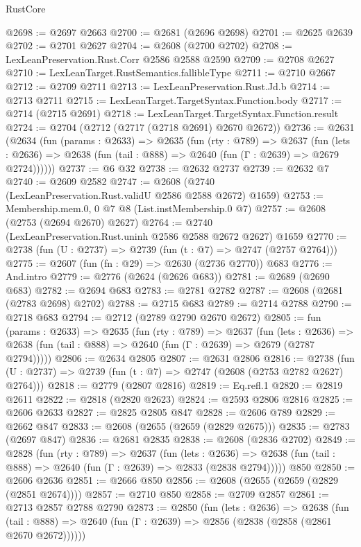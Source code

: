 \begin{lexlean}{RustCore}
\begin{coremodule}
@2698 := @2697 @2663
@2700 := @2681 (@2696 @2698)
@2701 := @2625 @2639
@2702 := @2701 @2627
@2704 := @2608 (@2700 @2702)
@2708 := LexLeanPreservation.Rust.Corr @2586 @2588 @2590
@2709 := @2708 @2627
@2710 := LexLeanTarget.RustSemantics.fallibleType
@2711 := @2710 @2667
@2712 := @2709 @2711
@2713 := LexLeanPreservation.Rust.Jd.b
@2714 := @2713 @2711
@2715 := LexLeanTarget.TargetSyntax.Function.body
@2717 := @2714 (@2715 @2691)
@2718 := LexLeanTarget.TargetSyntax.Function.result
@2724 := @2704 (@2712 (@2717 (@2718 @2691) @2670 @2672))
@2736 := @2631
    (@2634
      (fun (params : @2633) =>
      @2635
        (fun (rty : @789) =>
        @2637
          (fun (lets : @2636) =>
          @2638 (fun (tail : @888) => @2640 (fun (Γ : @2639) => @2679 @2724))))))
@2737 := @6 @32
@2738 := @2632 @2737
@2739 := @2632 @7
@2740 := @2609 @2582
@2747 := @2608 (@2740 (LexLeanPreservation.Rust.validU @2586 @2588 @2672) @1659)
@2753 := Membership.mem.{0, 0} @7 @8 (List.instMembership.{0} @7)
@2757 := @2608 (@2753 (@2694 @2670) @2627)
@2764 := @2740 (LexLeanPreservation.Rust.uninh @2586 @2588 @2672 @2627) @1659
@2770 := @2738 (fun (U : @2737) => @2739 (fun (t : @7) => @2747 (@2757 @2764)))
@2775 := @2607 (fun (fn : @29) => @2630 (@2736 @2770)) @683
@2776 := And.intro
@2779 := @2776 (@2624 (@2626 @683))
@2781 := @2689 (@2690 @683)
@2782 := @2694 @683
@2783 := @2781 @2782
@2787 := @2608 (@2681 (@2783 @2698) @2702)
@2788 := @2715 @683
@2789 := @2714 @2788
@2790 := @2718 @683
@2794 := @2712 (@2789 @2790 @2670 @2672)
@2805 := fun (params : @2633) =>
  @2635
    (fun (rty : @789) =>
    @2637
      (fun (lets : @2636) =>
      @2638 (fun (tail : @888) => @2640 (fun (Γ : @2639) => @2679 (@2787 @2794)))))
@2806 := @2634 @2805
@2807 := @2631 @2806
@2816 := @2738 (fun (U : @2737) => @2739 (fun (t : @7) => @2747 (@2608 (@2753 @2782 @2627) @2764)))
@2818 := @2779 (@2807 @2816)
@2819 := Eq.refl.{1}
@2820 := @2819 @2611
@2822 := @2818 (@2820 @2623)
@2824 := @2593 @2806 @2816
@2825 := @2606 @2633
@2827 := @2825 @2805 @847
@2828 := @2606 @789
@2829 := @2662 @847
@2833 := @2608 (@2655 (@2659 (@2829 @2675)))
@2835 := @2783 (@2697 @847)
@2836 := @2681 @2835
@2838 := @2608 (@2836 @2702)
@2849 := @2828
    (fun (rty : @789) =>
    @2637
      (fun (lets : @2636) =>
      @2638 (fun (tail : @888) => @2640 (fun (Γ : @2639) => @2833 (@2838 @2794)))))
    @850
@2850 := @2606 @2636
@2851 := @2666 @850
@2856 := @2608 (@2655 (@2659 (@2829 (@2851 @2674))))
@2857 := @2710 @850
@2858 := @2709 @2857
@2861 := @2713 @2857 @2788 @2790
@2873 := @2850
    (fun (lets : @2636) =>
    @2638
      (fun (tail : @888) => @2640 (fun (Γ : @2639) => @2856 (@2838 (@2858 (@2861 @2670 @2672))))))

\end{coremodule}
\end{lexlean}
